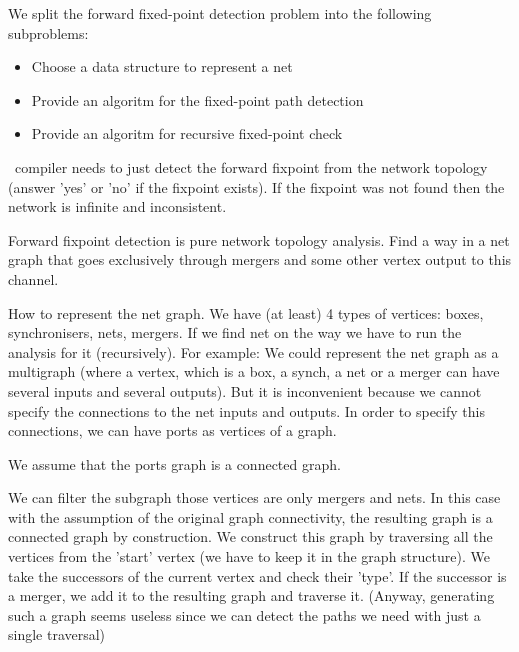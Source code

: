 We split the forward fixed-point detection problem into the following subproblems:
\begin{itemize}
\item Choose a data structure to represent a net
\item Provide an algoritm for the fixed-point path detection
\item Provide an algoritm for recursive fixed-point check
\end{itemize}


\ak\ compiler needs to just detect the forward fixpoint from the network topology (answer 'yes' or 'no' if the fixpoint exists). If the fixpoint was not found then the network is infinite and inconsistent.

Forward fixpoint detection is pure network topology analysis. Find a way in a net graph that goes exclusively through mergers and some other vertex output to this channel.

How to represent the net graph.
We have (at least) 4 types of vertices: boxes, synchronisers, nets, mergers.
If we find net on the way we have to run the analysis for it (recursively). For example:
%
We could represent the net graph as a multigraph (where a vertex, which is a box, a synch, a net or a merger can have several inputs and several outputs).
But it is inconvenient because we cannot specify the connections to the net inputs and outputs. In order to specify this connections, we can have ports as vertices of a graph.

We assume that the ports graph is a connected graph.

We can filter the subgraph those vertices are only mergers and nets. In this case with the assumption of the original graph connectivity, the resulting graph is a connected graph by construction.
We construct this graph by traversing all the vertices from the 'start' vertex (we have to keep it in the graph structure). We take the successors of the current vertex and check their 'type'. If the successor is a merger, we add it to the resulting graph and traverse it. (Anyway, generating such a graph seems useless since we can detect the paths we need with just a single traversal)

